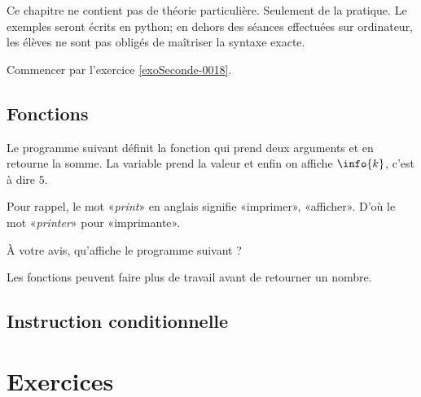 
Ce chapitre ne contient pas de théorie particulière. Seulement de la pratique. Le exemples seront écrits en python; en dehors des séances effectuées sur ordinateur, les élèves ne sont pas obligés de maîtriser la syntaxe exacte.

Commencer par l'exercice \ref{exoSeconde-0018}.

\subsection{Fonctions}

Le programme suivant définit la fonction  qui prend deux arguments et en retourne la somme. La variable  prend la valeur  et enfin on affiche \( \info{k}\), c'est à dire \( 5\).


Pour rappel, le mot «\emph{print}» en anglais signifie «imprimer», «afficher». D'où le mot «\emph{printer}» pour «imprimante».

À votre avis, qu'affiche le programme suivant ?


Les fonctions peuvent faire plus de travail avant de retourner un nombre.



\subsection{Instruction conditionnelle}

\section{Exercices}


